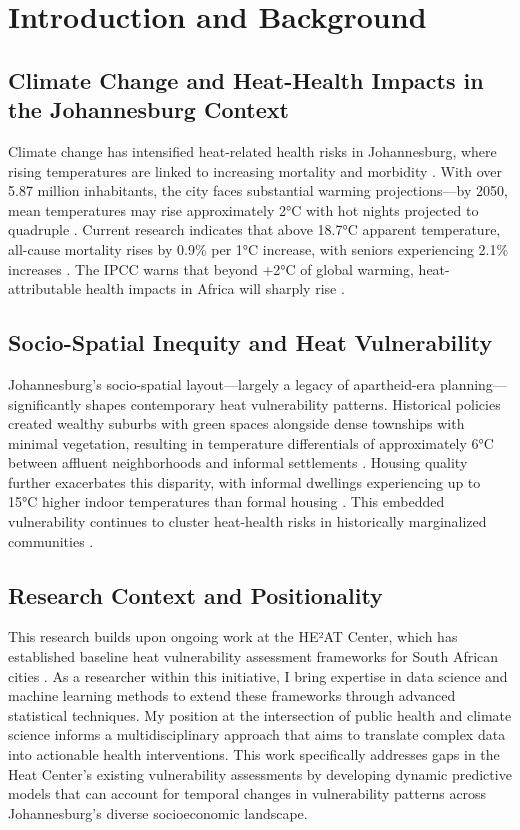 \section{Introduction and Background}

\subsection{Climate Change and Heat-Health Impacts in the Johannesburg Context}

Climate change has intensified heat-related health risks in Johannesburg, where rising temperatures are linked to increasing mortality and morbidity \citep{Gasparrini2015, Romanello2023}. With over 5.87 million inhabitants, the city faces substantial warming projections—by 2050, mean temperatures may rise approximately 2°C with hot nights projected to quadruple \citep{Engelbrecht2015, WorldBank2024}. Current research indicates that above 18.7°C apparent temperature, all-cause mortality rises by 0.9\% per 1°C increase, with seniors experiencing 2.1\% increases \citep{Wichmann2017}. The IPCC warns that beyond +2°C of global warming, heat-attributable health impacts in Africa will sharply rise \citep{IPCC2024}.

\subsection{Socio-Spatial Inequity and Heat Vulnerability}

Johannesburg's socio-spatial layout—largely a legacy of apartheid-era planning—significantly shapes contemporary heat vulnerability patterns. Historical policies created wealthy suburbs with green spaces alongside dense townships with minimal vegetation, resulting in temperature differentials of approximately 6°C between affluent neighborhoods and informal settlements \citep{WorldBank2024}. Housing quality further exacerbates this disparity, with informal dwellings experiencing up to 15°C higher indoor temperatures than formal housing \citep{Naicker2017}. This embedded vulnerability continues to cluster heat-health risks in historically marginalized communities \citep{Strauss2019}.

\subsection{Research Context and Positionality}
This research builds upon ongoing work at the HE²AT Center, which has established baseline heat vulnerability assessment frameworks for South African cities \citep{Jack}. As a researcher within this initiative, I bring expertise in data science and machine learning methods to extend these frameworks through advanced statistical techniques. My position at the intersection of public health and climate science informs a multidisciplinary approach that aims to translate complex data into actionable health interventions. This work specifically addresses gaps in the Heat Center's existing vulnerability assessments by developing dynamic predictive models that can account for temporal changes in vulnerability patterns across Johannesburg's diverse socioeconomic landscape.

